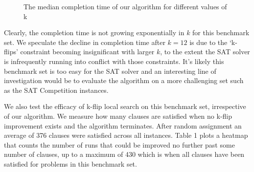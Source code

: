 \documentclass{article}
\begin{document}
\begin{figure}[htp]
\caption{The median completion time of our algorithm for different values of k}
\end{figure}

\noindent Clearly, the completion time is not growing exponentially in $k$ for
this benchmark set. We speculate the decline in completion time after $k=12$ is
due to the ‘k-flips’ constraint becoming insignificant with larger $k$, to the
extent the SAT solver is infrequently running into conflict with those
constraints. It's likely this benchmark set is too easy for the SAT solver and
an interesting line of investigation would be to evaluate the algorithm on a
more challenging set such as the SAT Competition instances.

We also test the efficacy of k-flip local search on this benchmark
set, irrespective of our algorithm. We measure how many clauses are satisfied
when no k-flip improvement exists and the algorithm terminates. After random
assignment an average of 376 clauses were satisfied across all instances.
Table 1 plots a heatmap that counts the number of runs that could be improved
no further past some number of clauses, up to a maximum of 430 which is when
all clauses have been satisfied for problems in this benchmark set. \\

\end{document}
